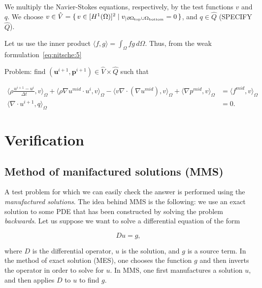 \documentclass[11pt,a4paper,titlepage]{report}
\begin{document}
We multiply the Navier-Stokes equations, respectively, by the test functions $v$ and $q$. We choose $v \in \hat{V} = \set{v \in [H^1(\Omega)]^2 | v_|{_{\partial \Omega_{\rm top} \cup \Omega_{\rm bottom}}} = 0}$, and $q \in \hat{Q}$ (SPECIFY $\hat{Q}$).


Let us use the inner product $\langle f,g \rangle = \int_{\Omega} fg \, d\Omega$. Thus, from the weak formulation~\eqref{eq:nitsche:5}

Problem: find $(\mathbf{u}^{i+1}, \mathbf{p}^{i+1}) \in \hat{V} \times \hat{Q}$ such that

\begin{align}
\langle \rho \frac{u^{i+1} - u^i}{\Delta t},v \rangle_\Omega
+ \langle \rho \nabla u^{mid} \cdot u^i  ,v \rangle_\Omega
- \langle v \nabla \cdot (\nabla u^{mid}) ,v \rangle_\Omega
+ \langle \nabla p^{mid} ,v \rangle_\Omega & = \langle f^{mid} ,v \rangle_\Omega \\
\langle \nabla \cdot u^{i+1},q \rangle_\Omega &=0 .
\end{align}



\chapter{Verification}

\section{Method of manifactured solutions (MMS)}

A test problem for which we can easily check the answer is performed using the \textit{manufactured solutions}. The idea behind MMS is the following: we use an exact solution to some PDE that has been constructed by solving the problem \textit{backwards}. Let us suppose we want to solve a differential equation of the form

\[
Du = g,
\]

where $D$ is the differential operator, $u$ is the solution, and $g$ is a source term. In the method of exact solution (MES), one chooses the function $g$ and then inverts the operator in order to solve for $u$. In MMS, one first manufactures a solution $u$, and then applies $D$ to $u$ to find $g$. \\
\end{document}
